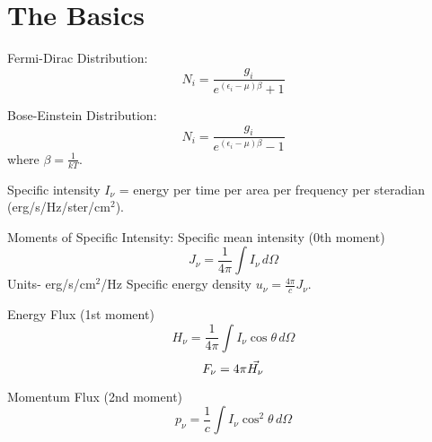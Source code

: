 \section{The Basics}
Fermi-Dirac Distribution:
\begin{displaymath}N_i=\frac{g_i}{e^{(\epsilon_i-\mu)\beta}+1}\end{displaymath}

Bose-Einstein Distribution:
\begin{displaymath}N_i=\frac{g_i}{e^{(\epsilon_i-\mu)\beta}-1}\end{displaymath}
where $\beta=\frac{1}{kT}$.

Specific intensity $I_{\nu}$ = energy per time per area per frequency per
steradian (erg/s/Hz/ster/cm$^2$).

Moments of Specific Intensity:\newline
Specific mean intensity (0th moment)\newline
\begin{displaymath}J_{\nu}=\frac{1}{4\pi}\int I_{\nu}\,d\Omega \end{displaymath}
Units- erg/s/cm$^2$/Hz\newline
Specific energy density $u_{\nu}=\frac{4\pi}{c}J_{\nu}$.

Energy Flux (1st moment)\newline
\begin{displaymath}H_{\nu}=\frac{1}{4\pi}\int I_{\nu}\cos \theta\,d\Omega \end{displaymath}
\begin{displaymath}F_{\nu}=4\pi \vec{H_{\nu}} \end{displaymath}

Momentum Flux (2nd moment)\newline
\begin{displaymath}p_{\nu}=\frac{1}{c}\int I_{\nu}\cos^2 \theta\,d\Omega  \end{displaymath}
